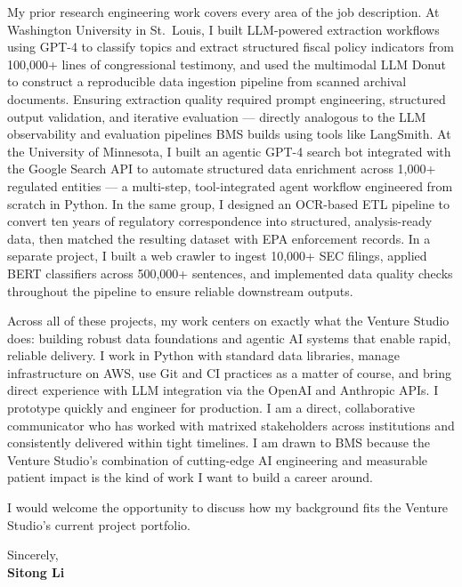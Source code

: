 \documentclass[12pt]{article}
\begin{document}
My prior research engineering work covers every area of the job description. At Washington University in St.\ Louis, I built LLM-powered extraction workflows using GPT-4 to classify topics and extract structured fiscal policy indicators from 100,000+ lines of congressional testimony, and used the multimodal LLM Donut to construct a reproducible data ingestion pipeline from scanned archival documents. Ensuring extraction quality required prompt engineering, structured output validation, and iterative evaluation --- directly analogous to the LLM observability and evaluation pipelines BMS builds using tools like LangSmith. At the University of Minnesota, I built an agentic GPT-4 search bot integrated with the Google Search API to automate structured data enrichment across 1,000+ regulated entities --- a multi-step, tool-integrated agent workflow engineered from scratch in Python. In the same group, I designed an OCR-based ETL pipeline to convert ten years of regulatory correspondence into structured, analysis-ready data, then matched the resulting dataset with EPA enforcement records. In a separate project, I built a web crawler to ingest 10,000+ SEC filings, applied BERT classifiers across 500,000+ sentences, and implemented data quality checks throughout the pipeline to ensure reliable downstream outputs.

Across all of these projects, my work centers on exactly what the Venture Studio does: building robust data foundations and agentic AI systems that enable rapid, reliable delivery. I work in Python with standard data libraries, manage infrastructure on AWS, use Git and CI practices as a matter of course, and bring direct experience with LLM integration via the OpenAI and Anthropic APIs. I prototype quickly and engineer for production. I am a direct, collaborative communicator who has worked with matrixed stakeholders across institutions and consistently delivered within tight timelines. I am drawn to BMS because the Venture Studio's combination of cutting-edge AI engineering and measurable patient impact is the kind of work I want to build a career around.

I would welcome the opportunity to discuss how my background fits the Venture Studio's current project portfolio.

\vspace{1em}

\noindent Sincerely,\\[0.5em]
\textbf{Sitong Li}
\end{document}
